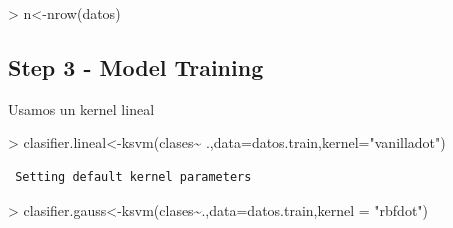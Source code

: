 \documentclass[
]{article}
\newenvironment{Shaded}{\begin{snugshade}}{\end{snugshade}}
\newcommand{\AttributeTok}[1]{\textcolor[rgb]{0.80,0.80,0.80}{#1}}
\newcommand{\CommentTok}[1]{\textcolor[rgb]{0.50,0.62,0.50}{#1}}
\newcommand{\ErrorTok}[1]{\textcolor[rgb]{0.76,0.75,0.62}{#1}}
\newcommand{\FunctionTok}[1]{\textcolor[rgb]{0.94,0.94,0.56}{#1}}
\newcommand{\NormalTok}[1]{\textcolor[rgb]{0.80,0.80,0.80}{#1}}
\newcommand{\OtherTok}[1]{\textcolor[rgb]{0.94,0.94,0.56}{#1}}
\newcommand{\SpecialCharTok}[1]{\textcolor[rgb]{0.86,0.64,0.64}{#1}}
\newcommand{\StringTok}[1]{\textcolor[rgb]{0.80,0.58,0.58}{#1}}
\begin{document}
\begin{Shaded}
\begin{Highlighting}[]
\SpecialCharTok{\textgreater{}}\NormalTok{ n}\OtherTok{\textless{}{-}}\FunctionTok{nrow}\NormalTok{(datos)}
\end{Highlighting}
\end{Shaded}

\begin{Shaded}
\end{Shaded}

\hypertarget{step-3---model-training}{%
\subsection{Step 3 - Model Training}\label{step-3---model-training}}

Usamos un kernel lineal

\begin{Shaded}
\begin{Highlighting}[]
\SpecialCharTok{\textgreater{}}\NormalTok{ clasifier.lineal}\OtherTok{\textless{}{-}}\FunctionTok{ksvm}\NormalTok{(clases}\SpecialCharTok{\textasciitilde{}}\NormalTok{ .,}\AttributeTok{data=}\NormalTok{datos.train,}\AttributeTok{kernel=}\StringTok{"vanilladot"}\NormalTok{)}
\end{Highlighting}
\end{Shaded}

\begin{verbatim}
 Setting default kernel parameters  
\end{verbatim}

\begin{Shaded}
\begin{Highlighting}[]
\SpecialCharTok{\textgreater{}}\NormalTok{ clasifier.gauss}\OtherTok{\textless{}{-}}\FunctionTok{ksvm}\NormalTok{(clases}\SpecialCharTok{\textasciitilde{}}\NormalTok{.,}\AttributeTok{data=}\NormalTok{datos.train,}\AttributeTok{kernel =} \StringTok{"rbfdot"}\NormalTok{)}
\end{Highlighting}
\end{Shaded}
\end{document}
